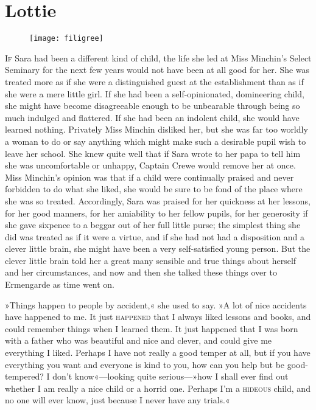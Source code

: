 \chapter{Lottie}

\begin{figure}[t!]
\centering
\texttt{[image: filigree]}
\end{figure}

\lettrine[lines=5]{I}{f} Sara had been a different kind of child, the life she led at Miss Minchin's Select Seminary for the next few years would not have been at all good for her. She was treated more as if she were a distinguished guest at the establishment than as if she were a mere little girl. If she had been a self-opinionated, domineering child, she might have become disagreeable enough to be unbearable through being so much indulged and flattered. If she had been an indolent child, she would have learned nothing. Privately Miss Minchin disliked her, but she was far too worldly a woman to do or say anything which might make such a desirable pupil wish to leave her school. She knew quite well that if Sara wrote to her papa to tell him she was uncomfortable or unhappy, Captain Crewe would remove her at once. Miss Minchin's opinion was that if a child were continually praised and never forbidden to do what she liked, she would be sure to be fond of the place where she was so treated. Accordingly, Sara was praised for her quickness at her lessons, for her good manners, for her amiability to her fellow pupils, for her generosity if she gave sixpence to a beggar out of her full little purse; the simplest thing she did was treated as if it were a virtue, and if she had not had a disposition and a clever little brain, she might have been a very self-satisfied young person. But the clever little brain told her a great many sensible and true things about herself and her circumstances, and now and then she talked these things over to Ermengarde as time went on.

»Things happen to people by accident,« she used to say. »A lot of nice accidents have happened to me. It just \textsc{happened} that I always liked lessons and books, and could remember things when I learned them. It just happened that I was born with a father who was beautiful and nice and clever, and could give me everything I liked. Perhaps I have not really a good temper at all, but if you have everything you want and everyone is kind to you, how can you help but be good-tempered? I don't know«—looking quite serious—»how I shall ever find out whether I am really a nice child or a horrid one. Perhaps I'm a \textsc{hideous} child, and no one will ever know, just because I never have any trials.«

